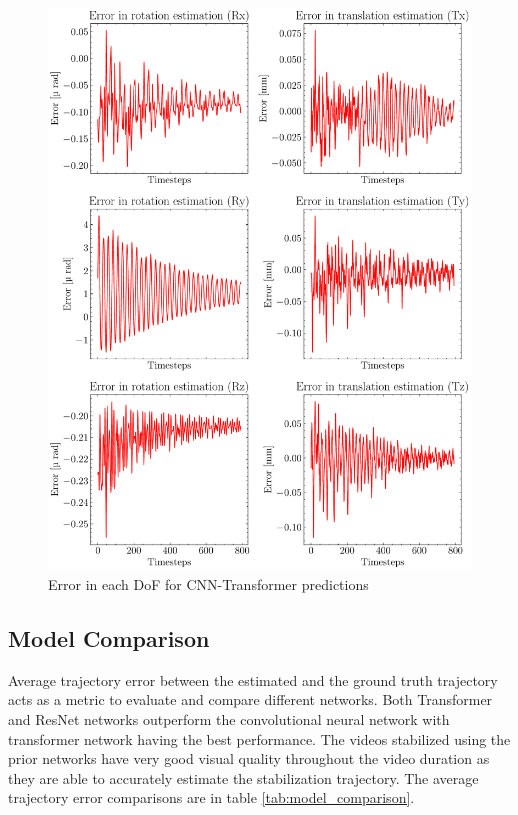\begin{figure}[H]
    \centering
    \includegraphics[scale=0.65]{images/fig_chapter4/nn_related/error_in_predicted_vs_ground_truth_transformer.pdf}
    \caption{Error in each DoF for CNN-Transformer predictions}
    \label{fig:cnn_trans_error}
\end{figure}

\subsection{Model Comparison}
Average trajectory error between the estimated and the ground truth trajectory acts as a metric to evaluate and compare different networks. Both Transformer and ResNet networks outperform the convolutional neural network with transformer network having the best performance. The videos stabilized using the prior networks have very good visual quality throughout the video duration as they are able to accurately estimate the stabilization trajectory.  The average trajectory error comparisons are in table \ref{tab:model_comparison}.

